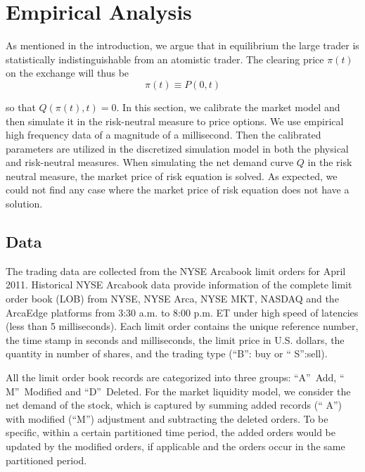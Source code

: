 \documentclass{article}
\begin{document}
\section{Empirical Analysis}

As mentioned in the introduction, we argue that in equilibrium the large
trader is statistically indistinguishable from an atomistic trader. The
clearing price $\pi (t)$ on the exchange will thus be%
\begin{equation*}
\pi (t)\equiv P(0,t)
\end{equation*}

so that $Q(\pi (t),t)=0$. In this section, we calibrate the market model and
then simulate it in the risk-neutral measure to price options. We use
empirical high frequency data of a magnitude of a millisecond. Then the
calibrated parameters are utilized in the discretized simulation model in
both the physical and risk-neutral measures. When simulating the net demand
curve $Q$ in the risk neutral measure, the market price of risk equation is
solved. As expected, we could not find any case where the market price of
risk equation does not have a solution.

\subsection{Data}

The trading data are collected from the NYSE Arcabook limit orders for April
2011. Historical NYSE Arcabook data provide information of the complete
limit order book (LOB) from NYSE, NYSE Arca, NYSE MKT, NASDAQ and the
ArcaEdge platforms from 3:30 a.m. to 8:00 p.m. ET under high speed of
latencies (less than 5 milliseconds). Each limit order contains the unique
reference number, the time stamp in seconds and milliseconds, the limit
price in U.S. dollars, the quantity in number of shares, and the trading
type (\textquotedblleft B\textquotedblright : buy or \textquotedblleft
S\textquotedblright :sell).

All the limit order book records are categorized into three groups:
\textquotedblleft A\textquotedblright\ Add, \textquotedblleft
M\textquotedblright\ Modified and \textquotedblleft D\textquotedblright\
Deleted. For the market liquidity model, we consider the net demand of the
stock, which is captured by summing added records (\textquotedblleft
A\textquotedblright ) with modified (\textquotedblleft M\textquotedblright )
adjustment and subtracting the deleted orders. To be specific, within a
certain partitioned time period, the added orders would be updated by the
modified orders, if applicable and the orders occur in the same partitioned
period.
\end{document}
